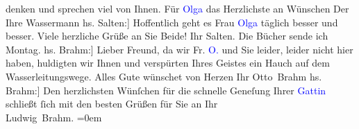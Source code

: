                denken und sprechen viel von Ihnen.\pend
           \pstart
           \introOben{}Für \textcolor{blue}{Olga}{}\ledrightnote{\textcolor{blue}{Olga Schnitzler}} das Herzlichste an
                  Wünschen\introOben{}\pend
           \pstart Der Ihre \spacefill\mbox{Wassermann}\pend{}\pstart
           \noindent{}{[}hs. Salten:{]} Hoffentlich geht es Frau \textcolor{blue}{Olga}{}\ledrightnote{\textcolor{blue}{Olga Schnitzler}} täglich besser und besser. Viele herzliche Grüße an Sie Beide!\pend
           \pstart Ihr \spacefill\mbox{Salten.}\pend{}\pstart
           \noindent{}Die Bücher sende ich Montag.\pend
           \pstart
           \noindent{}{[}hs. Brahm:{]} Lieber Freund, da wir Fr. \textcolor{blue}{O.}{}\ledrightnote{\textcolor{blue}{Olga Schnitzler}} und
               Sie leider, leider nicht hier haben, huldigten wir Ihnen und verspürten Ihres Geistes
               ein Hauch auf dem Wasserleitungswege. Alles Gute wünschet von Herzen\pend
           \pstart Ihr \spacefill\mbox{Otto Brahm}\pend{}\pstart
           \noindent{}{[}hs. Brahm:{]} Den herzlichsten Wünſchen für die schnelle Geneſung Ihrer
                  \textcolor{blue}{Gattin}{}\ledrightnote{\textcolor{blue}{Olga Schnitzler}} schließt ſich mit den besten Grüßen für
               Sie an\pend
           \pstart
           Ihr{\\[\baselineskip]}\spacefill\mbox{Ludwig Brahm.}\pend
           \leftskip=0em{}\endnumbering{}  
      